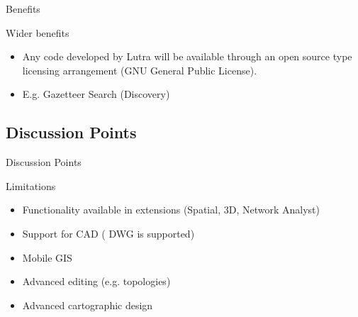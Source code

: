 \begin{frame}{Benefits}
	\begin{block}{Wider benefits}
		\begin{itemize}
			\item Any code developed by Lutra will be available through an open source type licensing arrangement (GNU General Public License). 
			
			
			\item E.g. Gazetteer Search (Discovery)
	
		\end{itemize}
	\end{block}
\end{frame}

\subsection{Discussion Points}
\begin{frame}{Discussion Points}
	\begin{block}{Limitations}
			\begin{itemize}
				\item Functionality available in extensions (Spatial, 3D, Network Analyst)
				
				\item Support for CAD ( DWG is supported)
								
				\item Mobile GIS
							
				\item Advanced editing (e.g. topologies)
				
				\item Advanced cartographic design
				
				
			\end{itemize}
	\end{block}
\end{frame}

